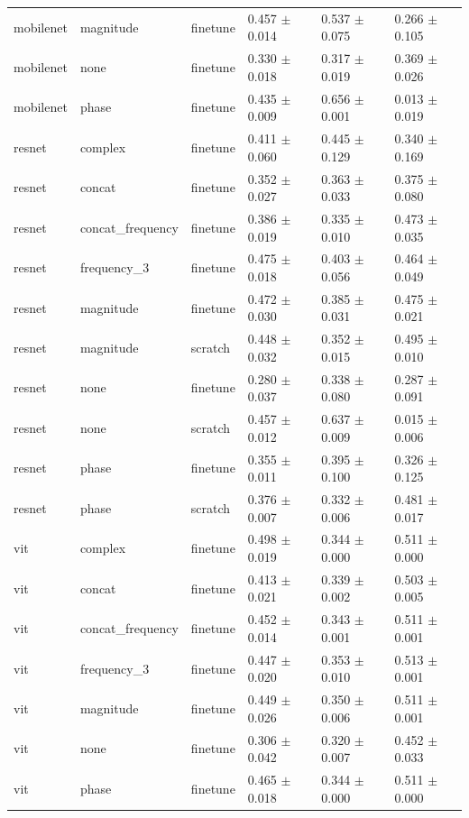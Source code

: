 \begin{table}
\begin{tabular}{llllll}
mobilenet & magnitude & finetune & 0.457 $\pm$ 0.014 & 0.537 $\pm$ 0.075 & 0.266 $\pm$ 0.105 \\
mobilenet & none & finetune & 0.330 $\pm$ 0.018 & 0.317 $\pm$ 0.019 & 0.369 $\pm$ 0.026 \\
mobilenet & phase & finetune & 0.435 $\pm$ 0.009 & 0.656 $\pm$ 0.001 & 0.013 $\pm$ 0.019 \\
resnet & complex & finetune & 0.411 $\pm$ 0.060 & 0.445 $\pm$ 0.129 & 0.340 $\pm$ 0.169 \\
resnet & concat & finetune & 0.352 $\pm$ 0.027 & 0.363 $\pm$ 0.033 & 0.375 $\pm$ 0.080 \\
resnet & concat_frequency & finetune & 0.386 $\pm$ 0.019 & 0.335 $\pm$ 0.010 & 0.473 $\pm$ 0.035 \\
resnet & frequency_3 & finetune & 0.475 $\pm$ 0.018 & 0.403 $\pm$ 0.056 & 0.464 $\pm$ 0.049 \\
resnet & magnitude & finetune & 0.472 $\pm$ 0.030 & 0.385 $\pm$ 0.031 & 0.475 $\pm$ 0.021 \\
resnet & magnitude & scratch & 0.448 $\pm$ 0.032 & 0.352 $\pm$ 0.015 & 0.495 $\pm$ 0.010 \\
resnet & none & finetune & 0.280 $\pm$ 0.037 & 0.338 $\pm$ 0.080 & 0.287 $\pm$ 0.091 \\
resnet & none & scratch & 0.457 $\pm$ 0.012 & 0.637 $\pm$ 0.009 & 0.015 $\pm$ 0.006 \\
resnet & phase & finetune & 0.355 $\pm$ 0.011 & 0.395 $\pm$ 0.100 & 0.326 $\pm$ 0.125 \\
resnet & phase & scratch & 0.376 $\pm$ 0.007 & 0.332 $\pm$ 0.006 & 0.481 $\pm$ 0.017 \\
vit & complex & finetune & 0.498 $\pm$ 0.019 & 0.344 $\pm$ 0.000 & 0.511 $\pm$ 0.000 \\
vit & concat & finetune & 0.413 $\pm$ 0.021 & 0.339 $\pm$ 0.002 & 0.503 $\pm$ 0.005 \\
vit & concat_frequency & finetune & 0.452 $\pm$ 0.014 & 0.343 $\pm$ 0.001 & 0.511 $\pm$ 0.001 \\
vit & frequency_3 & finetune & 0.447 $\pm$ 0.020 & 0.353 $\pm$ 0.010 & 0.513 $\pm$ 0.001 \\
vit & magnitude & finetune & 0.449 $\pm$ 0.026 & 0.350 $\pm$ 0.006 & 0.511 $\pm$ 0.001 \\
vit & none & finetune & 0.306 $\pm$ 0.042 & 0.320 $\pm$ 0.007 & 0.452 $\pm$ 0.033 \\
vit & phase & finetune & 0.465 $\pm$ 0.018 & 0.344 $\pm$ 0.000 & 0.511 $\pm$ 0.000 \\

\end{tabular}
\end{table}
